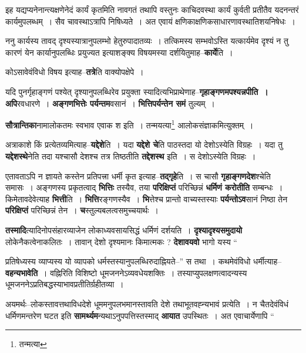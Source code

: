 \documentclass[article,12pt,a4paper]{memoir}
\begin{document}
	  \pstart इह यद्यप्यनेनान्त्यक्षणेनेदं कार्यं कृतमिति नावगतं तथापि वस्तुनः काचिदवस्था कार्यं कुर्वती प्रतीतैव यदनन्तरं कार्यमुपलब्धम् । सैव चावस्थाऽत्रापि निषिध्यते । अत एवायं क्षणिकाक्षणिकसाधारणावस्थातिशयनिषेधः ।
	\pend
      

	  \pstart ननु कार्यस्य ता\leavevmode{}वद् दृश्यस्यात्रानुपलम्भो हेतुरुपादातव्यः । तत्किमस्य सम्भवोऽस्ति यत्कार्यमेव दृश्यं न तु कारणं येन कार्यानुपलब्धिः प्रयुज्यत इत्याशङ्क्य विषयमस्या दर्शयितुमाह--\textbf{कार्ये}ति ।
	\pend
      

	  \pstart कोऽसावेवंविधो विषय इत्याह--\textbf{तत्रे}ति वाक्योपक्षेपे ।
	\pend
      

	  \pstart यदि पुनर्गृहाङ्गणं पश्येत् दृश्यानुपलब्धिरेव प्रयुक्ता स्यादित्यभिप्राथेणाह--\textbf{गृहाङ्गणमपश्यन्नपीति । अपि}रवधारणे । \textbf{अङ्गणभित्तेः पर्यन्तम}वसानं । \textbf{भित्तिपर्यन्तेन समं} तुल्यम् ।
	\pend
      

	  \pstart \textbf{सौत्रान्तिका}नामालोकतमः स्वभाव एवाक श इति । तन्मयत्या\footnote{तन्मत्या} आलोकसंज्ञाकमित्युक्तम् ।
	\pend
      

	  \pstart अत्राकाशे किं प्रत्येतव्यमित्याह--\textbf{यद्देशे}ति । यदा \textbf{यद्देशे चे}ति पाठस्तदा यो देशोऽस्येति विग्रहः । यदा तु \textbf{यद्देशस्थे}नेति तदा यश्चासौ देशश्च तत्र तिष्ठतीति \textbf{तद्देशस्थ} इति । स देशोऽस्येति विग्रहः ।
	\pend
      

	  \pstart एतावताऽपि न ज्ञायते कस्तेन प्रतिपत्त्रा धर्मी कृत इत्याह--\textbf{तद्गृहे}ति । स चासौ \textbf{गृहाङ्गणदेश}श्चेति समासः । अङ्गणस्य प्रकृतत्वाद् \textbf{भित्तिः} तस्यैव, तया \textbf{परिक्षिप्तं} परिच्छिन्नं \textbf{धर्मिणं करोतीति} सम्बन्धः । किमेतावदेवेत्याह \textbf{भित्ती}ति । \textbf{भित्ति}रङ्गणस्यैव । \textbf{भि}त्तेश्च प्रान्तो वाच्यस्तस्याः \textbf{पर्यन्तोऽव}सानं निष्ठा तेन \textbf{परिक्षिप्तं} परिच्छिन्नं तेन । \textbf{च}स्तुल्यबलत्वसमुच्चयार्थः ।
	\pend
      

	  \pstart \textbf{तस्मादि}त्यादिनोपसंहारव्याजेन लोकाध्यवसायसिद्धं धर्मिणं दर्शयति । \textbf{दृश्यादृश्यसमुदायो} लोकेनैकत्वेनाकलितः । तावान् देशो दृश्यमानः किमात्मकः ? \textbf{देशावयवो} भागो यस्य  \leavevmode{} “
	  
	प्रतिषेध्यस्य व्याप्यस्य यो व्यापको धर्मस्तस्यानुपलब्धिरुदाह्नियते--” स तथा । कथमेवंविधो धर्मीत्याह--\textbf{वहन्यभावेति} । वह्निरिति विशिष्टो धूमजननेऽव्यवधेयशक्तिः । तस्याप्युपलक्षणत्वादन्यस्य धूमजननेऽप्रतिबद्धस्याभावप्रतीतिर्ग्रहीतव्या ।
	\pend
      

	  \pstart अयमर्थः--लोकस्तावत्तथाविधदेशे धूममनुपलभमानस्तावति देशे तथाभूतवह्न्यभावं प्रत्येति । न चैतदेवंविधं धर्मिणमन्तरेण घटत इति \textbf{सामर्थ्यम}न्यथाऽनुपपत्तिस्तस्माद् \textbf{आयात} उपस्थितः । अत एवाचार्येणापि “
	    \pend
	  
\end{document}
